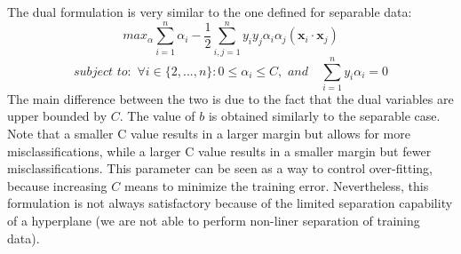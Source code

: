 The dual formulation is very similar to the one defined for separable data:
\[max_{\alpha} \sum_{i=1}^{n}\alpha_{i} - \frac{1}{2}\sum_{i,j=1}^{n}y_{i}y_{j}\alpha_{i}\alpha_{j}(\textbf{x}_{i}\cdot \textbf{x}_{j})\]
\[subject \,\, to: \,\, \forall i \in \{2,...,n\}: 0 \leq \alpha_{i} \leq C,\,\, and \quad \sum_{i=1}^{n}y_{i}\alpha_{i} = 0\]
The main difference between the two is due to the fact that the dual variables are upper bounded by $C$. The value of $b$ is obtained similarly to the separable case.\newline\newline
Note that a smaller C value results in a larger margin but allows for more misclassifications, while a larger C value results in a smaller margin but fewer misclassifications. This parameter can be seen as a way to control over-fitting, because increasing $C$ means to minimize the training error.\newline\newline
Nevertheless, this formulation is not always satisfactory because of the limited separation capability of a hyperplane (we are not able to perform non-liner separation of training data).
